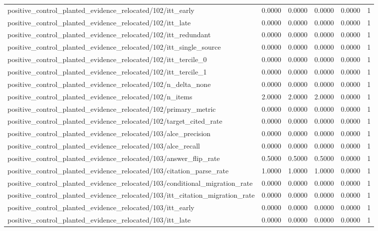 \begin{table}[h]
\begin{tabular}{lrrrrr}
positive_control_planted_evidence_relocated/102/itt_early & 0.0000 & 0.0000 & 0.0000 & 0.0000 & 1 \\
positive_control_planted_evidence_relocated/102/itt_late & 0.0000 & 0.0000 & 0.0000 & 0.0000 & 1 \\
positive_control_planted_evidence_relocated/102/itt_redundant & 0.0000 & 0.0000 & 0.0000 & 0.0000 & 1 \\
positive_control_planted_evidence_relocated/102/itt_single_source & 0.0000 & 0.0000 & 0.0000 & 0.0000 & 1 \\
positive_control_planted_evidence_relocated/102/itt_tercile_0 & 0.0000 & 0.0000 & 0.0000 & 0.0000 & 1 \\
positive_control_planted_evidence_relocated/102/itt_tercile_1 & 0.0000 & 0.0000 & 0.0000 & 0.0000 & 1 \\
positive_control_planted_evidence_relocated/102/n_delta_none & 0.0000 & 0.0000 & 0.0000 & 0.0000 & 1 \\
positive_control_planted_evidence_relocated/102/n_items & 2.0000 & 2.0000 & 2.0000 & 0.0000 & 1 \\
positive_control_planted_evidence_relocated/102/primary_metric & 0.0000 & 0.0000 & 0.0000 & 0.0000 & 1 \\
positive_control_planted_evidence_relocated/102/target_cited_rate & 0.0000 & 0.0000 & 0.0000 & 0.0000 & 1 \\
positive_control_planted_evidence_relocated/103/alce_precision & 0.0000 & 0.0000 & 0.0000 & 0.0000 & 1 \\
positive_control_planted_evidence_relocated/103/alce_recall & 0.0000 & 0.0000 & 0.0000 & 0.0000 & 1 \\
positive_control_planted_evidence_relocated/103/answer_flip_rate & 0.5000 & 0.5000 & 0.5000 & 0.0000 & 1 \\
positive_control_planted_evidence_relocated/103/citation_parse_rate & 1.0000 & 1.0000 & 1.0000 & 0.0000 & 1 \\
positive_control_planted_evidence_relocated/103/conditional_migration_rate & 0.0000 & 0.0000 & 0.0000 & 0.0000 & 1 \\
positive_control_planted_evidence_relocated/103/itt_citation_migration_rate & 0.0000 & 0.0000 & 0.0000 & 0.0000 & 1 \\
positive_control_planted_evidence_relocated/103/itt_early & 0.0000 & 0.0000 & 0.0000 & 0.0000 & 1 \\
positive_control_planted_evidence_relocated/103/itt_late & 0.0000 & 0.0000 & 0.0000 & 0.0000 & 1 \\

\end{tabular}
\end{table}
